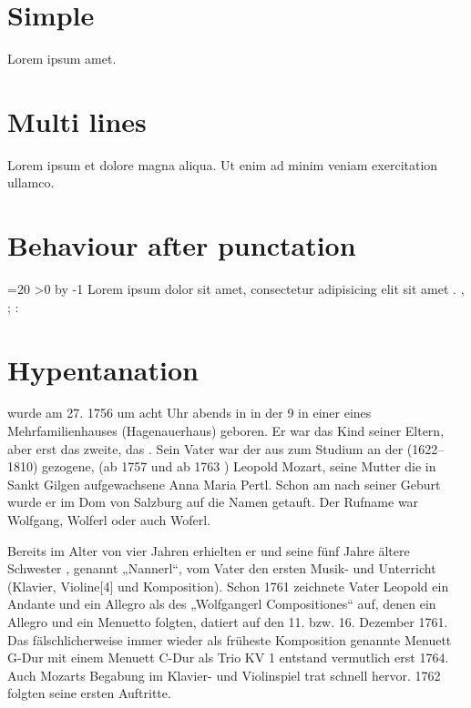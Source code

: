 \documentclass{article}
\begin{document}
\section{Simple}

Lorem ipsum  amet.

\section{Multi lines}

Lorem ipsum  et dolore magna aliqua. Ut enim ad
minim veniam exercitation ullamco.

\section{Behaviour after punctation}

\def\clozepunctation{%
  Lorem ipsum dolor sit amet, consectetur adipisicing elit sit amet
  \cloze{Lorem}.
  \cloze{ipsum},
  \cloze{dolor};
  \cloze{sit}: %
}

\def\Repeat[#1]#2{
  \count0=#1
  \loop
  \ifnum\count0>0
  \advance{} by -1
  #2%
  \repeat
}
\Repeat[20]\clozepunctation

\section{Hypentanation}

 wurde am 27.  1756 um acht
Uhr abends in  in der  9 in einer
 eines Mehrfamilienhauses
(Hagenauerhaus) geboren. Er war das  Kind seiner Eltern,
aber erst das zweite, das . Sein Vater war der aus
 zum Studium an der 
(1622–1810)  gezogene,  (ab 1757  und ab 1763
) Leopold Mozart, seine Mutter die in Sankt
Gilgen aufgewachsene Anna Maria Pertl. Schon am  nach
seiner Geburt wurde er im Dom von Salzburg auf die Namen  getauft. Der Rufname war Wolfgang,
Wolferl oder auch Woferl.

Bereits im Alter von vier Jahren erhielten er und seine fünf Jahre
ältere Schwester , genannt „Nannerl“,
vom Vater den ersten Musik- und  Unterricht
(Klavier, Violine[4] und Komposition). Schon 1761 zeichnete Vater
Leopold ein Andante und ein Allegro als des „Wolfgangerl Compositiones“
auf, denen ein Allegro und ein Menuetto folgten, datiert auf den 11.
bzw. 16. Dezember 1761. Das fälschlicherweise immer wieder als früheste
Komposition genannte Menuett G-Dur mit einem Menuett C-Dur als Trio KV 1
entstand vermutlich erst 1764. Auch Mozarts Begabung im Klavier- und
Violinspiel trat schnell hervor. 1762 folgten seine ersten Auftritte.
\end{document}
